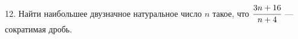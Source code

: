 12. Найти наибольшее двузначное натуральное число $n$ такое, что $\cfrac{3n+16}{n+4}$ --- сократимая дробь.\\
